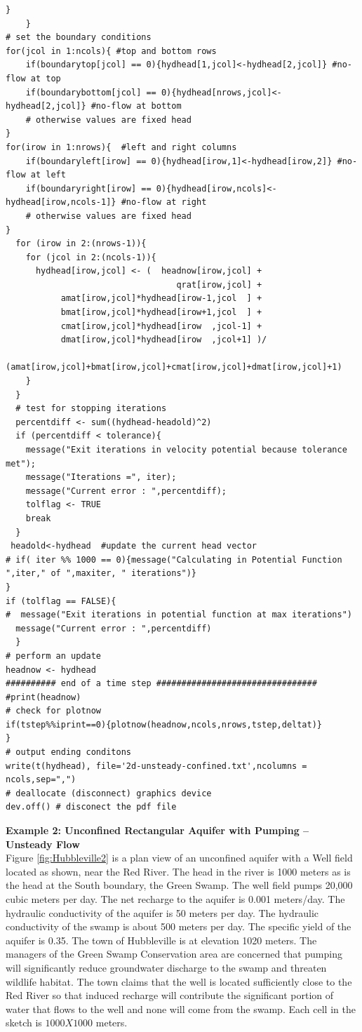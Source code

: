 \begin{lstlisting}[caption= Listing for \textbf{R} implementation for unsteady unconfined flow using Jacobi iteration , label=lst:2DUnsteadyUnconfined]
        }
    }
# set the boundary conditions
for(jcol in 1:ncols){ #top and bottom rows
    if(boundarytop[jcol] == 0){hydhead[1,jcol]<-hydhead[2,jcol]} #no-flow at top
    if(boundarybottom[jcol] == 0){hydhead[nrows,jcol]<-hydhead[2,jcol]} #no-flow at bottom
    # otherwise values are fixed head
}
for(irow in 1:nrows){  #left and right columns
    if(boundaryleft[irow] == 0){hydhead[irow,1]<-hydhead[irow,2]} #no-flow at left
    if(boundaryright[irow] == 0){hydhead[irow,ncols]<-hydhead[irow,ncols-1]} #no-flow at right
    # otherwise values are fixed head
}
  for (irow in 2:(nrows-1)){
    for (jcol in 2:(ncols-1)){
      hydhead[irow,jcol] <- (  headnow[irow,jcol] +
                                  qrat[irow,jcol] +
           amat[irow,jcol]*hydhead[irow-1,jcol  ] +
           bmat[irow,jcol]*hydhead[irow+1,jcol  ] +
           cmat[irow,jcol]*hydhead[irow  ,jcol-1] +
           dmat[irow,jcol]*hydhead[irow  ,jcol+1] )/
        (amat[irow,jcol]+bmat[irow,jcol]+cmat[irow,jcol]+dmat[irow,jcol]+1)
    }
  }
  # test for stopping iterations
  percentdiff <- sum((hydhead-headold)^2)
  if (percentdiff < tolerance){
    message("Exit iterations in velocity potential because tolerance met");
    message("Iterations =", iter);
    message("Current error : ",percentdiff);
    tolflag <- TRUE
    break
  }
 headold<-hydhead  #update the current head vector
# if( iter %% 1000 == 0){message("Calculating in Potential Function ",iter," of ",maxiter, " iterations")}
}
if (tolflag == FALSE){
#  message("Exit iterations in potential function at max iterations")
  message("Current error : ",percentdiff)
  }
# perform an update
headnow <- hydhead
########## end of a time step ################################
#print(headnow)
# check for plotnow
if(tstep%%iprint==0){plotnow(headnow,ncols,nrows,tstep,deltat)}
}
# output ending conditons
write(t(hydhead), file='2d-unsteady-confined.txt',ncolumns = ncols,sep=",")
# deallocate (disconnect) graphics device
dev.off() # disconect the pdf file
\end{lstlisting}

\textbf{Example 2: Unconfined Rectangular Aquifer with Pumping -- Unsteady Flow}\\
Figure \ref{fig:Hubbleville2} is a plan view of an unconfined aquifer with a Well field located as shown, near the Red River.
The head in the river is 1000 meters as is the head at the South boundary, the Green Swamp.
The well field pumps 20,000 cubic meters per day.
The net recharge to the aquifer is 0.001 meters/day.
The hydraulic conductivity of the aquifer is 50 meters per day.
The hydraulic conductivity of the swamp is about 500 meters per day.
The specific yield of the aquifer is 0.35.
The town of Hubbleville is at elevation 1020 meters.
The managers of the Green Swamp Conservation area are concerned that pumping will significantly reduce groundwater
discharge to the swamp and threaten wildlife habitat. 
The town claims that the well is located sufficiently close to the Red River so that induced recharge will contribute the significant portion of water that flows to the well and none will come from the swamp.
Each cell in the sketch is $1000 X 1000$ meters.

